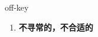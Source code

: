 
\begin{frame}
{\huge off-key}
\begin{center}
\begin{enumerate}\Large
  \item \textbf{不寻常的，不合适的}
\end{enumerate}
\end{center}
\end{frame}
